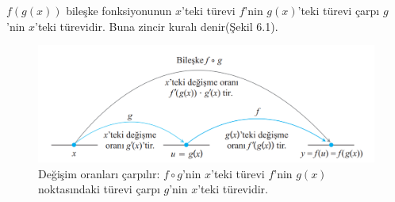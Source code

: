 $f(g(x))$ bileşke fonksiyonunun $x$'teki türevi $f$'nin $g(x)$'teki türevi çarpı $g$'nin $x$'teki türevidir. Buna zincir kuralı denir(Şekil 6.1).
\begin{figure}[H]
	\centering
	\includegraphics[width=1\linewidth]{bilesketurev.png}
	\caption{Değişim oranları çarpılır: $f \circ g$'nin $x$'teki türevi $f$'nin $g(x)$ noktasındaki türevi çarpı $g$'nin $x$'teki türevidir.}
	\label{fig:ornekresim}
\end{figure}

